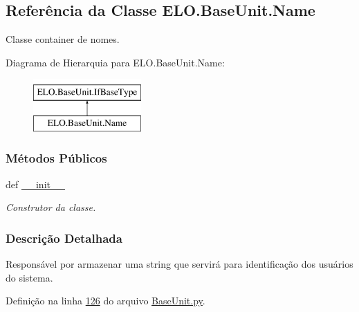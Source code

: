 \hypertarget{classELO_1_1BaseUnit_1_1Name}{\subsection{Referência da Classe E\-L\-O.\-Base\-Unit.\-Name}
\label{classELO_1_1BaseUnit_1_1Name}
}


Classe container de nomes.  


Diagrama de Hierarquia para E\-L\-O.\-Base\-Unit.\-Name\-:\begin{figure}[H]
\begin{center}
\leavevmode
\includegraphics[height=2.000000cm]{d9/dff/classELO_1_1BaseUnit_1_1Name}
\end{center}
\end{figure}
\subsubsection*{Métodos Públicos}
\begin{DoxyCompactItemize}
\item 
def \hyperlink{classELO_1_1BaseUnit_1_1Name_ad73fdab6426635b79b4447ac53c10279}{\-\_\-\-\_\-init\-\_\-\-\_\-}
\begin{DoxyCompactList}\small\item\em Construtor da classe. \end{DoxyCompactList}\end{DoxyCompactItemize}


\subsubsection{Descrição Detalhada}
Responsável por armazenar uma string que servirá para identificação dos usuários do sistema. 

Definição na linha \hyperlink{BaseUnit_8py_source_l00126}{126} do arquivo \hyperlink{BaseUnit_8py_source}{Base\-Unit.\-py}.




